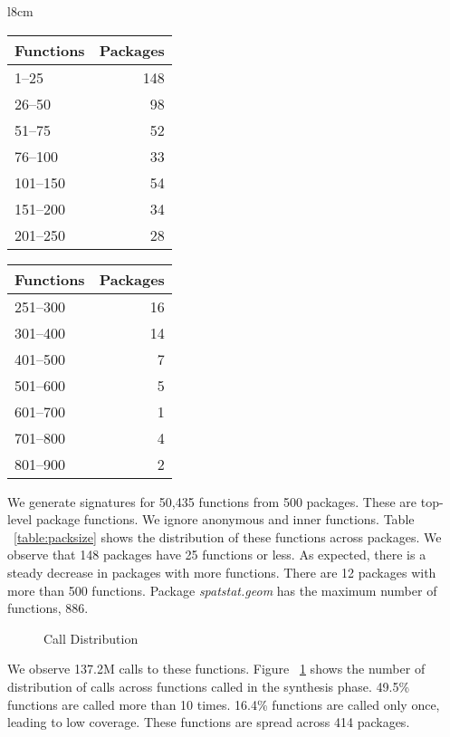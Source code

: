\documentclass[screen,acmsmall]{acmart}
\begin{document}
\begin{wraptable}{l}{8cm}
  \vspace{-3mm}
  \small
  \caption{Package Size} \label{table:packsize}
  \centering
  \begin{tabular}{lr}
    \toprule
    \bf Functions&\bf Packages\\
    \midrule
    1--25&148\\
    26--50&98\\
    51--75&52\\
    76--100&33\\
    101--150&54\\
    151--200&34\\
    201--250&28\\
    \bottomrule
  \end{tabular}
  \quad
  \begin{tabular}{lr}
    \toprule
    \bf Functions&\bf Packages\\
    \midrule
    251--300&16\\
    301--400&14\\
    401--500&7\\
    501--600&5\\
    601--700&1\\
    701--800&4\\
    801--900&2\\
    \bottomrule
  \end{tabular}
\end{wraptable}

We generate signatures for 50,435 functions from 500 packages. These are
top-level package functions. We ignore anonymous and inner functions. Table
~\ref{table:packsize} shows the distribution of these functions across packages.
We observe that 148 packages have 25 functions or less. As expected, there is a
steady decrease in packages with more functions. There are 12 packages with more
than 500 functions. Package \emph{spatstat.geom} has the maximum number of
functions, 886.

\begin{figure}[!h]
  \centering
  
  \caption{Call Distribution}
  \label{fig:callDist}
\end{figure}

We observe 137.2M calls to these functions. Figure ~\ref{fig:callDist} shows the
number of distribution of calls across functions called in the synthesis
phase. 49.5\% functions are called more than 10 times. 16.4\% functions are
called only once, leading to low coverage. These functions are spread across 414
packages.
\end{document}
